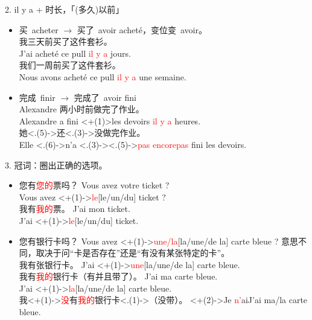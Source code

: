 \documentclass[french, aspectratio=169, 14pt, handout]{beamer}
\newcommand{\red}[1]{\textcolor{red}{#1}} %
\begin{document}
\begin{CJK*}{UTF8}{gkai}
\begin{frame}{2. il y a + 时长，「(多久)以前」}
\begin{itemize}
	\item 买~acheter $\rightarrow$ 买了~\pause avoir acheté，变位变~avoir。\pause  \\
	我三天前买了这件套衫。 \pause \\ J'ai acheté \pause ce pull \pause \red{il y a}  jours.  \pause \\
	我们一周前买了这件套衫。\pause \\ Nous avons acheté \pause ce pull \pause \red{il y a} \pause une semaine.  \pause
	\item 完成~finir $\rightarrow$ 完成了~\pause avoir fini \pause \\
	Alexandre 两小时前做完了作业。 \pause \\ Alexandre a fini \pause \alert<+(1)>{les} devoirs \pause \red{il y a}  heures.  \pause \\
	她\alert<.(5)->{还}\alert<.(3)->{没}做完作业。\pause \\ Elle \only<.(6)->{n'}a \visible<.(3)->{\alt<.(5)->{\red{pas encore}}{\red{pas}}} fini les devoirs.
\end{itemize}
\end{frame}

\begin{frame}{3. 冠词：圈出正确的选项。}
\begin{itemize}
	\item 您有\red{您的}票吗？ Vous avez votre ticket ?  \pause \\
	\hspace{80px} Vous avez \alt<+(1)->{\red{le}}{[le/un/du]} ticket ?  \pause \\
	我有\red{我的}票。 J'ai mon ticket.  \pause \\
	\hspace{70px} J’ai \alt<+(1)->{\red{le}}{[le/un/du]} ticket.  \pause
	\item 您有银行卡吗？ Vous avez \alt<+(1)->{\red{une/la}}{[la/une/de la]} carte bleue ? \pause 意思不同，取决于问“卡是否存在”还是“有没有某张特定的卡”。 \pause \\
	我有张银行卡。 J’ai \alt<+(1)->{\red{une}}{[la/une/de la]} carte bleue.  \pause \\
    我有\red{我的}银行卡（有并且带了）。 J'ai ma carte bleue.  \pause \\
    \hspace{180px} J’ai \alt<+(1)->{\red{la}}{[la/une/de la]} carte bleue. \pause \\
	我\visible<+(1)->{\red{没}}有\red{我的}银行卡\visible<.(1)->{（没带）}。 \alt<+(2)->{Je \red{n'}ai}{J'ai} \visible<+->{\red{pas}} ma/la carte bleue. 
\end{itemize}
\end{frame}


\end{CJK*}
\end{document}
